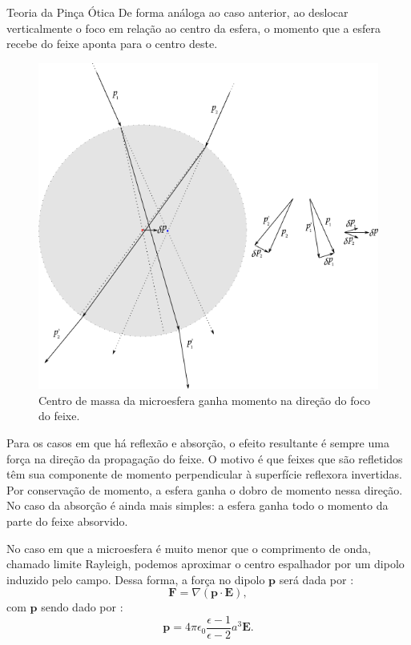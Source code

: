 \begin{chapter}{Teoria da Pinça Ótica}
De forma análoga ao caso anterior, ao deslocar verticalmente o foco em relação ao centro da esfera, o momento que a esfera recebe do feixe aponta para o centro deste.
%
\begin{figure}[h]
\begin{center}
\includegraphics[scale=.7]{geom_lateralIII}
\caption{Centro de massa da microesfera ganha momento na direção do foco do feixe.}
\label{foco_lateral}
\end{center}
\end{figure}
%

Para os casos em que há reflexão e absorção, o efeito resultante é sempre uma força na direção da propagação do feixe. O motivo é que feixes que são refletidos têm sua componente de momento perpendicular à superfície reflexora invertidas. Por conservação de momento, a esfera ganha o dobro de momento nessa direção. No caso da absorção é ainda mais simples: a esfera ganha todo o momento da parte do feixe absorvido.

No caso em que a microesfera é muito menor que o comprimento de onda, chamado limite Rayleigh, podemos aproximar o centro espalhador por um dipolo induzido pelo campo. Dessa forma, a força no dipolo ${\mathbf p}$ será dada por \cite{Mazolli}:
%
\begin{equation}
{\mathbf F} = \nabla({\mathbf p}\cdot{\mathbf E}),
\end{equation}
%
com ${\mathbf p}$ sendo dado por \cite{Jackson1998}:
%
\begin{equation}
{\mathbf p} = 4\pi\epsilon_0 \frac{\epsilon-1}{\epsilon-2}a^3{\mathbf E}.
\end{equation}
%


\end{chapter}
